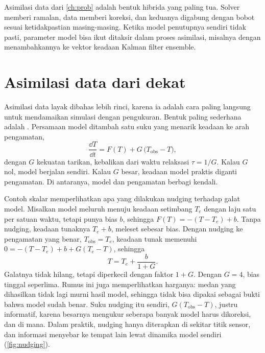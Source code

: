 Asimilasi data dari \cref{ch:prob} adalah bentuk hibrida yang paling tua. Solver memberi ramalan, data
memberi koreksi, dan keduanya digabung dengan bobot sesuai ketidakpastian masing-masing. Ketika model
penutupnya sendiri tidak pasti, parameter model bisa ikut ditaksir dalam proses asimilasi, misalnya
dengan menambahkannya ke vektor keadaan Kalman filter ensemble.

\section{Asimilasi data dari dekat}

Asimilasi data layak dibahas lebih rinci, karena ia adalah cara paling langsung untuk mendamaikan simulasi dengan
pengukuran. Bentuk paling sederhana adalah . Persamaan model ditambah satu suku yang menarik keadaan ke
arah pengamatan,
\begin{equation}
\frac{\dd T}{\dd t}=F(T)+G\,\big(T_{\mathrm{obs}}-T\big),
\end{equation}
dengan $G$ kekuatan tarikan, kebalikan dari waktu relaksasi $\tau=1/G$. Kalau $G$ nol, model berjalan sendiri. Kalau $G$
besar, keadaan model praktis diganti pengamatan. Di antaranya, model dan pengamatan berbagi kendali.

Contoh skalar memperlihatkan apa yang dilakukan nudging terhadap galat model. Misalkan model meluruh menuju keadaan
setimbang $T_e$ dengan laju satu per satuan waktu, tetapi punya bias $b$, sehingga $F(T)=-(T-T_e)+b$. Tanpa nudging,
keadaan tunaknya $T_e+b$, meleset sebesar bias. Dengan nudging ke pengamatan yang benar, $T_{\mathrm{obs}}=T_e$, keadaan
tunak memenuhi $0=-(T-T_e)+b+G(T_e-T)$, sehingga
\begin{equation}
T=T_e+\frac{b}{1+G}.
\end{equation}
Galatnya tidak hilang, tetapi diperkecil dengan faktor $1+G$. Dengan $G=4$, bias tinggal seperlima. Rumus ini juga
memperlihatkan harganya: medan yang dihasilkan tidak lagi murni hasil model, sehingga tidak bisa dipakai sebagai bukti
bahwa model sudah benar. Suku nudging itu sendiri, $G(T_{\mathrm{obs}}-T)$, justru informatif, karena besarnya mengukur
seberapa banyak model harus dikoreksi, dan di mana. Dalam praktik, nudging hanya diterapkan di sekitar titik sensor, dan
informasi menyebar ke tempat lain lewat dinamika model sendiri (\cref{fig:nudging}).

